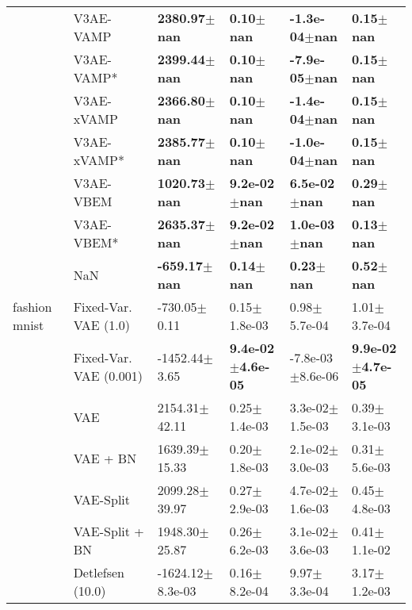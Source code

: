 \begin{tabular}{llllll}
             & V3AE-VAMP &     \textbf{2380.97$\pm$nan} &         \textbf{0.10$\pm$nan} &     \textbf{-1.3e-04$\pm$nan} &         \textbf{0.15$\pm$nan} \\
             & V3AE-VAMP* &     \textbf{2399.44$\pm$nan} &         \textbf{0.10$\pm$nan} &     \textbf{-7.9e-05$\pm$nan} &         \textbf{0.15$\pm$nan} \\
             & V3AE-xVAMP &     \textbf{2366.80$\pm$nan} &         \textbf{0.10$\pm$nan} &     \textbf{-1.4e-04$\pm$nan} &         \textbf{0.15$\pm$nan} \\
             & V3AE-xVAMP* &     \textbf{2385.77$\pm$nan} &         \textbf{0.10$\pm$nan} &     \textbf{-1.0e-04$\pm$nan} &         \textbf{0.15$\pm$nan} \\
             & V3AE-VBEM &     \textbf{1020.73$\pm$nan} &      \textbf{9.2e-02$\pm$nan} &      \textbf{6.5e-02$\pm$nan} &         \textbf{0.29$\pm$nan} \\
             & V3AE-VBEM* &     \textbf{2635.37$\pm$nan} &      \textbf{9.2e-02$\pm$nan} &      \textbf{1.0e-03$\pm$nan} &         \textbf{0.13$\pm$nan} \\
             & NaN &     \textbf{-659.17$\pm$nan} &         \textbf{0.14$\pm$nan} &         \textbf{0.23$\pm$nan} &         \textbf{0.52$\pm$nan} \\
fashion mnist & Fixed-Var. VAE (1.0) &             -730.05$\pm$0.11 &              0.15$\pm$1.8e-03 &              0.98$\pm$5.7e-04 &              1.01$\pm$3.7e-04 \\
             & Fixed-Var. VAE (0.001) &            -1452.44$\pm$3.65 &  \textbf{9.4e-02$\pm$4.6e-05} &          -7.8e-03$\pm$8.6e-06 &  \textbf{9.9e-02$\pm$4.7e-05} \\
             & VAE &            2154.31$\pm$42.11 &              0.25$\pm$1.4e-03 &           3.3e-02$\pm$1.5e-03 &              0.39$\pm$3.1e-03 \\
             & VAE + BN &            1639.39$\pm$15.33 &              0.20$\pm$1.8e-03 &           2.1e-02$\pm$3.0e-03 &              0.31$\pm$5.6e-03 \\
             & VAE-Split &            2099.28$\pm$39.97 &              0.27$\pm$2.9e-03 &           4.7e-02$\pm$1.6e-03 &              0.45$\pm$4.8e-03 \\
             & VAE-Split + BN &            1948.30$\pm$25.87 &              0.26$\pm$6.2e-03 &           3.1e-02$\pm$3.6e-03 &              0.41$\pm$1.1e-02 \\
             & Detlefsen (10.0) &         -1624.12$\pm$8.3e-03 &              0.16$\pm$8.2e-04 &              9.97$\pm$3.3e-04 &              3.17$\pm$1.2e-03 \\

\end{tabular}
